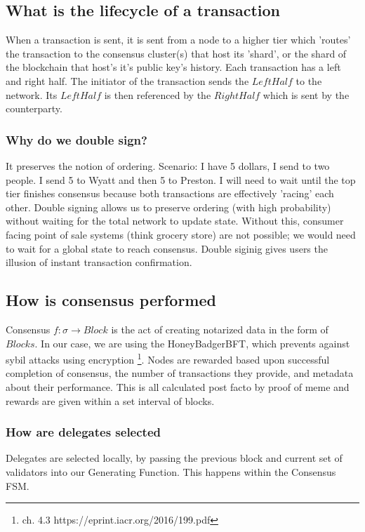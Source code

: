\documentclass{article}
\begin{document}
\subsection{What is the lifecycle of a transaction}
When a transaction is sent, it is sent from a node to a higher tier which 'routes' the transaction to the consensus cluster(s) that host its 'shard', or the shard of the blockchain that host's it's public key's history. Each transaction has a left and right half. The initiator of the transaction sends the $LeftHalf$ to the network. Its $LeftHalf$ is then referenced by the $RightHalf$ which is sent by the counterparty.

\subsubsection{Why do we double sign?}
It preserves the notion of ordering. Scenario: I have 5 dollars, I send to two people. I send 5 to Wyatt and then 5 to Preston. I will need to wait until the top tier finishes consensus because both transactions are effectively 'racing' each other. Double signing allows us to preserve ordering (with high probability) without waiting for the total network to update state. Without this, consumer facing point of sale systems (think grocery store) are not possible; we would need to wait for a global state to reach consensus. Double siginig gives users the illusion of instant transaction confirmation.

\subsection{How is consensus performed}
Consensus $f: \sigma \rightarrow  Block$ is the act of creating notarized data in the form of $Blocks$. In our case, we are using the HoneyBadgerBFT, which prevents against sybil attacks using encryption \footnote{ch. 4.3 https://eprint.iacr.org/2016/199.pdf}. Nodes are rewarded based upon successful completion of consensus, the number of transactions they provide, and metadata about their performance. This is all calculated post facto by proof of meme and rewards are given within a set interval of blocks.

\subsubsection{How are delegates selected}
Delegates are selected locally, by passing the previous block and current set of validators into our Generating Function. This happens within the Consensus FSM.
\end{document}
